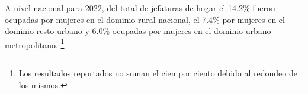 A nivel nacional para 2022, del total de jefaturas de hogar el 14.2\% fueron ocupadas por mujeres en el dominio rural nacional, el 7.4\% por mujeres en el dominio resto urbano y 6.0\% ocupadas por mujeres en el dominio urbano metropolitano. \footnote{Los resultados reportados no suman el cien por ciento debido al redondeo de los mismos.}